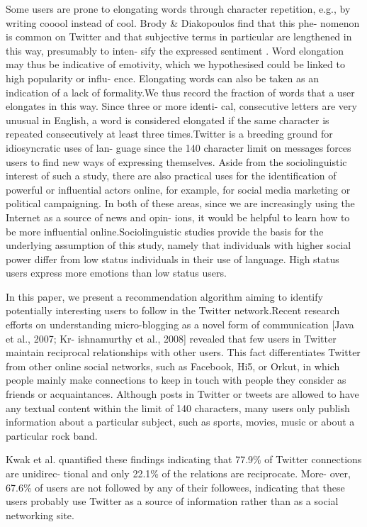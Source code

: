\documentclass[twocolumn]{svjour3}          %
\begin{document}
Some users are prone to elongating words through character repetition, e.g., by writing cooool instead of cool. Brody \& Diakopoulos find that this phe- nomenon is common on Twitter and that subjective terms in particular are lengthened in this way, presumably to inten- sify the expressed sentiment \cite{brody2011col}. Word elongation may thus be indicative of emotivity, which we hypothesised could be linked to high popularity or influ- ence. Elongating words can also be taken as an indication of a lack of formality.We thus record the fraction of words that a user elongates in this way. Since three or more identi- cal, consecutive letters are very unusual in English, a word is considered elongated if the same character is repeated consecutively at least three times.Twitter is a breeding ground for idiosyncratic uses of lan- guage since the 140 character limit on messages forces users to find new ways of expressing themselves. 
Aside from the sociolinguistic interest of such a study, there are also practical uses for the identification of powerful or influential actors online, for example, for social media marketing or political campaigning. In both of these areas, since we are increasingly using the Internet as a source of news and opin- ions, it would be helpful to learn how to be more influential online.Sociolinguistic studies provide the basis for the underlying assumption of this study, namely that individuals with higher social power differ from low status individuals in their use of language. High status users express more emotions than low status users.\cite{tchokni2014emoticons}

In this paper, we present a recommendation algorithm aiming to identify potentially interesting users to follow in the Twitter network.Recent research efforts on understanding micro-blogging as a novel form of communication \cite{}[Java et al., 2007; Kr- ishnamurthy et al., 2008] revealed that few users in Twitter maintain reciprocal relationships with other users. This fact differentiates Twitter from other online social networks, such as Facebook, Hi5, or Orkut, in which people mainly make connections to keep in touch with people they consider as friends or acquaintances. Although posts in Twitter or tweets are allowed to have any
textual content within the limit of 140 characters, many users only publish information about a particular subject, such as sports, movies, music or about a particular rock band.\cite{armentano2011recommending}



Kwak et al. \cite{kwak2010twitter} quantified these findings indicating that 77.9\% of Twitter connections are unidirec- tional and only 22.1\% of the relations are reciprocate. More- over, 67.6\% of users are not followed by any of their followees, indicating that these users probably use Twitter as a source of information rather than as a social networking site.
\end{document}
